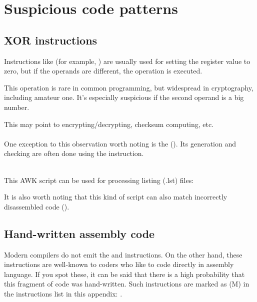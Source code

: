\section{Suspicious code patterns}

\subsection{XOR instructions}

Instructions like  (for example, ) 
are usually used for setting the register value
to zero, but if the operands are different, the  operation
is executed.

This operation is rare in common programming, but widespread in cryptography,
including amateur one.
It's especially suspicious if the
second operand is a big number.

This may point to encrypting/decrypting, checksum computing, etc.\\
\\

One exception to this observation worth noting is the  (). 
Its generation and checking are often done using the \XOR instruction. \\
\\

This AWK script can be used for processing \IDA{} listing (.lst) files:



It is also worth noting that this kind of script can also match incorrectly disassembled code 
().

\subsection{Hand-written assembly code}


Modern compilers do not emit the  and  instructions.
On the other hand, these instructions are well-known to coders who like to code directly in assembly language.
If you spot these, it can be said that there is a high probability that this fragment of code was hand-written.
Such instructions are marked as (M) in the instructions list in this appendix: .

